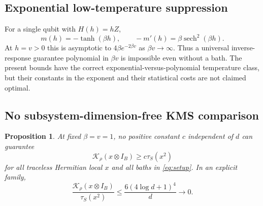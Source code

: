 \documentclass[11pt]{article}
\newtheorem{proposition}[theorem]{Proposition}
\theoremstyle{remark}\newtheorem{remark}[theorem]{Remark}
\newcommand{\tauS}{\tau_S}
\begin{document}
\subsection{Exponential low-temperature suppression}
For a single qubit with $H(h)=hZ$,
\[
 m(h)=-\tanh(\beta h),\qquad
 -m'(h)=\beta\operatorname{sech}^2(\beta h).
\]
At $h=v>0$ this is asymptotic to $4\beta e^{-2\beta v}$ as $\beta v\to\infty$. Thus a universal inverse-response guarantee polynomial in $\beta v$ is impossible even without a bath. The present bounds have the correct exponential-versus-polynomial temperature class, but their constants in the exponent and their statistical costs are not claimed optimal.

\subsection{No subsystem-dimension-free KMS comparison}
\begin{proposition}\label{prop:dimension}
At fixed $\beta=v=1$, no positive constant $c$ independent of $d$ can guarantee
\[
 \mathcal K_\rho(x\otimes I_B)\geq c\tauS(x^2)
\]
for all traceless Hermitian local $x$ and all baths in \eqref{eq:setup}. In an explicit family,
\[
 \frac{\mathcal K_\rho(x\otimes I_B)}{\tauS(x^2)}
 \leq\frac{6(4\log d+1)^4}{d}\longrightarrow0.
\]
\end{proposition}
\end{document}
